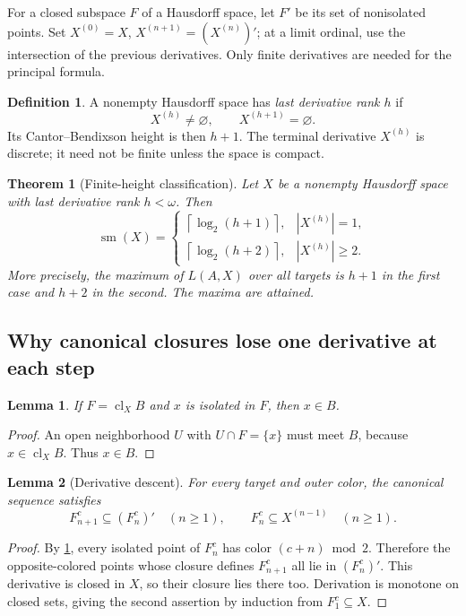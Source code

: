 \documentclass[11pt,letterpaper]{article}
\numberwithin{equation}{section}
\newtheorem{theorem}{Theorem}[section]
\newtheorem{lemma}[lemma]{Lemma}
\theoremstyle{definition}
\newtheorem{definition}[definition]{Definition}
\theoremstyle{remark}
\newcommand{\sm}{\operatorname{sm}}
\newcommand{\cl}{\operatorname{cl}}
\newcommand{\ceil}[1]{\left\lceil#1\right\rceil}
\begin{document}
For a closed subspace $F$ of a Hausdorff space, let $F'$ be its set of
nonisolated points. Set $X^{(0)}=X$, $X^{(n+1)}=(X^{(n)})'$; at a limit ordinal,
use the intersection of the previous derivatives. Only finite derivatives are
needed for the principal formula.

\begin{definition}
A nonempty Hausdorff space has \emph{last derivative rank $h$} if
\[
 X^{(h)}\ne\varnothing,\qquad X^{(h+1)}=\varnothing.
\]
Its Cantor--Bendixson height is then $h+1$. The terminal derivative $X^{(h)}$
is discrete; it need not be finite unless the space is compact.
\end{definition}

\begin{theorem}[Finite-height classification]\label{thm:height}
Let $X$ be a nonempty Hausdorff space with last derivative rank $h<\omega$.
Then
\begin{equation}\label{eq:height}
 \boxed{\quad
 \sm(X)=
 \begin{cases}
  \ceil{\log_2(h+1)},& |X^{(h)}|=1,\\[2pt]
  \ceil{\log_2(h+2)},& |X^{(h)}|\geq2.
 \end{cases}\quad}
\end{equation}
More precisely, the maximum of $L(A,X)$ over all targets is $h+1$ in the first
case and $h+2$ in the second. The maxima are attained.
\end{theorem}

\subsection{Why canonical closures lose one derivative at each step}

\begin{lemma}\label{lem:isolation}
If $F=\cl_X B$ and $x$ is isolated in $F$, then $x\in B$.
\end{lemma}
\begin{proof}
An open neighborhood $U$ with $U\cap F=\{x\}$ must meet $B$, because
$x\in\cl_X B$. Thus $x\in B$.
\end{proof}

\begin{lemma}[Derivative descent]\label{lem:descent}
For every target and outer color, the canonical sequence satisfies
\begin{equation}\label{eq:descent}
 F^c_{n+1}\subseteq(F^c_n)'\quad(n\geq1),
 \qquad F^c_n\subseteq X^{(n-1)}\quad(n\geq1).
\end{equation}
\end{lemma}
\begin{proof}
By \cref{lem:isolation}, every isolated point of $F^c_n$ has color
$(c+n)\bmod2$. Therefore the opposite-colored points whose closure defines
$F^c_{n+1}$ all lie in $(F^c_n)'$. This derivative is closed in $X$, so their
closure lies there too. Derivation is monotone on closed sets, giving the
second assertion by induction from $F^c_1\subseteq X$.
\end{proof}
\end{document}
